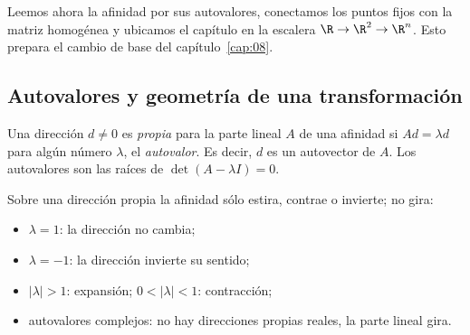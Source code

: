 Leemos ahora la afinidad por sus autovalores, conectamos los puntos fijos con la matriz
homogénea y ubicamos el capítulo en la escalera \(\R\to\R^2\to\R^n\). Esto prepara el cambio
de base del capítulo~\ref{cap:08}.

\subsection{Autovalores y geometría de una transformación}\label{sec:autovalores-geom}

\begin{definicion}\label{def:06-direccion-propia}
Una dirección \(d\neq0\) es \emph{propia} para la parte lineal \(A\) de una afinidad si
\(Ad=\lambda d\) para algún número \(\lambda\), el \emph{autovalor}. Es decir, \(d\) es un
autovector de \(A\). Los autovalores son las raíces de \(\det(A-\lambda I)=0\).
\end{definicion}

Sobre una dirección propia la afinidad sólo estira, contrae o invierte; no gira:
\begin{itemize}
  \item \(\lambda=1\): la dirección no cambia;
  \item \(\lambda=-1\): la dirección invierte su sentido;
  \item \(|\lambda|>1\): expansión; \(0<|\lambda|<1\): contracción;
  \item autovalores complejos: no hay direcciones propias reales, la parte lineal gira.
\end{itemize}

